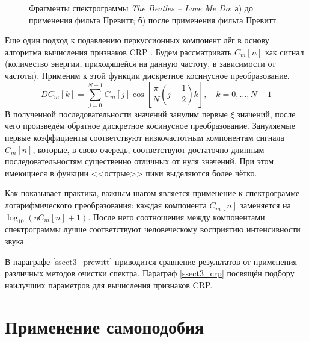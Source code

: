 \begin{figure}[h]
  \begin{minipage}[h]{0.49\linewidth}
  \end{minipage}
  \hfill
  \begin{minipage}[h]{0.49\linewidth}
  \end{minipage}
  \caption{Фрагменты спектрограммы \emph{The Beatles -- Love Me Do}: а)
  до применения фильта Превитт; б) после применения фильта Превитт.}
  \label{img:spectb}  
\end{figure}

Еще один подход к подавлению перкуссионных компонент лёг в основу алгоритма
вычисления признаков CRP \cite{Mueller2009}. Будем рассматривать $C_m[n]$ как
сигнал (количество энергии, приходящейся на данную частоту, в зависимости от
частоты). Применим к этой функции дискретное косинусное преобразование.
$$ DC_m[k] = \sum\limits_{j=0}^{N-1} C_m[j] \cos\left[ \frac{\pi}{N} \left(
j+\frac{1}{2} \right) k \right], \quad k=0, \ldots, N-1 $$
В полученной последовательности значений занулим первые $\xi$ значений, после
чего произведём обратное дискретное косинусное преобразование. Зануляемые первые
коэффициенты соответствуют низкочастотным компонентам сигнала $C_m[n]$, которые,
в свою очередь, соответствуют достаточно длинным последовательностям существенно
отличных от нуля значений. При этом имеющиеся в функции <<острые>> пики
выделяются более чётко.

Как показывает практика, важным шагом является применение к спектрограмме
логарифмического преобразования: каждая компонента $C_m[n]$ заменяется на
$\log_{10}(\eta C_m[n] + 1)$. После него соотношения между компонентами
спектрограммы лучше соответствуют человеческому восприятию интенсивности звука.

В параграфе \ref{ssect3_prewitt} приводится сравнение результатов от применения
различных методов очистки спектра. Параграф \ref{ssect3_crp} посвящён подбору
наилучших параметров для вычисления признаков CRP.


\section{Применение самоподобия} \label{sect1_selfsim}

